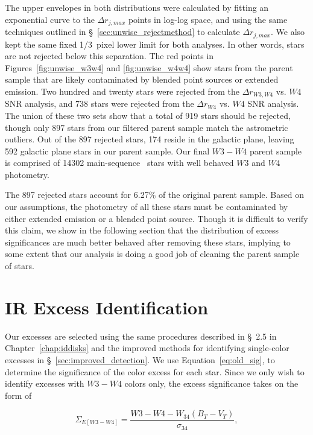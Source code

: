     The upper envelopes in both distributions were calculated by fitting an exponential curve to the $\Delta r_{j,max}$ points in log-log space, and using the same techniques outlined in \S~\ref{sec:unwise_rejectmethod} to calculate $\Delta r_{j,max}$. We also kept the same fixed 1/3~pixel lower limit for both analyses. In other words, stars are not rejected below this separation. The red points in Figures~\ref{fig:unwise_w3w4} and \ref{fig:unwise_w4w4} show stars from the parent sample that are likely contaminated by blended point sources or extended emission. Two hundred and twenty stars were rejected from the $\Delta r_{W3,W4}$ vs. $W4$ SNR analysis, and 738 stars were rejected from the $\Delta r_{W4}$ vs. $W4$ SNR analysis. The union of these two sets show that a total of 919 stars should be rejected, though only 897 stars from our filtered parent sample match the astrometric outliers. Out of the 897 rejected stars, 174 reside in the galactic plane, leaving 592 galactic plane stars in our parent sample. Our final $W3-W4$ parent sample is comprised of 14302 main-sequence \hip\ stars with well behaved $W3$ and $W4$ photometry.
    
    The 897 rejected stars account for 6.27\% of the original parent sample. Based on our assumptions, the photometry of all these stars must be contaminated by either extended emission or a blended point source. Though it is difficult to verify this claim, we show in the following section that the distribution of excess significances are much better behaved after removing these stars, implying to some extent that our analysis is doing a good job of cleaning the parent sample of stars.
    

\section{IR Excess Identification}

    Our excesses are selected using the same procedures described in \S~2.5 in Chapter~\ref{chap:iddisks} and the improved methods for identifying single-color excesses in \S~\ref{sec:improved_detection}. We use Equation~\ref{eq:old_sig}, to determine the significance of the color excess for each star. Since we only wish to identify excesses with $W3-W4$ colors only, the excess significance takes on the form of
    
    \begin{equation}\label{eq:excess_sig_w3-w4}
    \Sigma_{E[W3-W4]} = \frac{W3-W4-W_{34}(B_T-V_T)}{\sigma_{34}},
    \end{equation}

